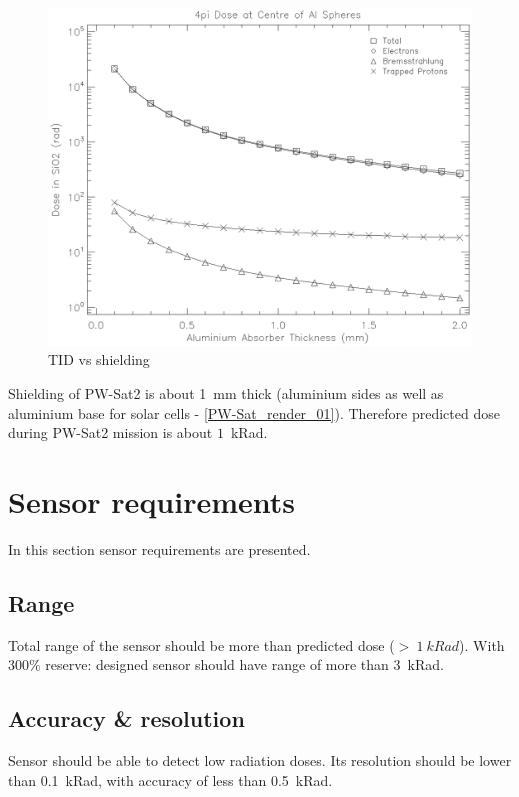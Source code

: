 	\begin{figure}[H]
		\centering
		\includegraphics[width=0.7\paperwidth]{img/dose.eps}
		\caption{TID vs shielding}
		\label{TIDvsSheilding}
	\end{figure}

	Shielding of PW-Sat2 is about \SI{1}{mm} thick (aluminium sides as well as aluminium base for solar cells - \ref{PW-Sat_render_01}). Therefore predicted dose during PW-Sat2 mission is about $1$~kRad.




\section{Sensor requirements}
	In this section sensor requirements are presented.

\subsection{Range}
	Total range of the sensor should be more than predicted dose ($>~\SI{1}{kRad}$). With 300\% reserve: designed sensor should have range of more than \SI{3}{kRad}.
	
\subsection{Accuracy \& resolution}
	Sensor should be able to detect low radiation doses. Its resolution should be lower than \SI{0.1}{kRad}, with accuracy of less than \SI{0.5}{kRad}.




